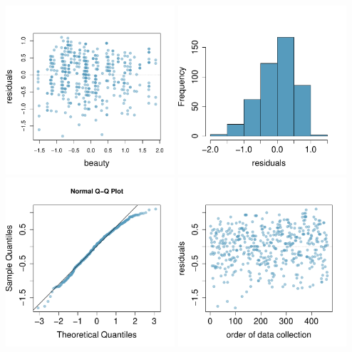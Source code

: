 {\begin{center}
\includegraphics[width=0.47\textwidth]{07/figures/eoce/prof/beauty_eval_res}
\includegraphics[width=0.47\textwidth]{07/figures/eoce/prof/beauty_eval_res_hist} \\
\includegraphics[width=0.47\textwidth]{07/figures/eoce/prof/beauty_eval_res_qq}
\includegraphics[width=0.47\textwidth]{07/figures/eoce/prof/beauty_eval_res_order}
\end{center}

}
